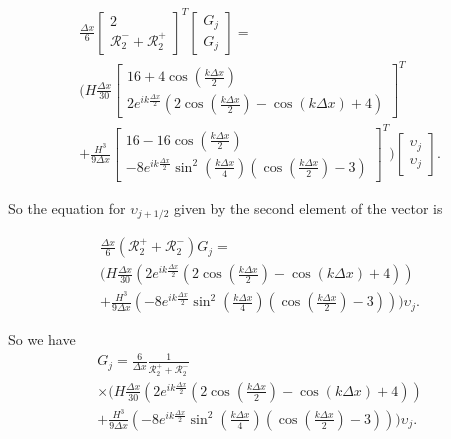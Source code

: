 \begin{multline*}
\frac{\Delta x}{6}\begin{bmatrix} 2  \\ \mathcal{R}^-_2 + \mathcal{R}^+_2 \end{bmatrix}^T \begin{bmatrix} G_j  \\ G_j\end{bmatrix}  = \\ \Bigg(H\frac{\Delta x}{30}\begin{bmatrix} 16  + 4 \cos\left(\frac{k \Delta x}{2}\right) \\ 2e^{ik\frac{\Delta x}{2}}\left(2\cos\left(\frac{k \Delta x}{2}\right) - \cos\left({k \Delta x}\right) + 4\right)  \end{bmatrix}^T  \\+ \frac{H^3 }{9\Delta x}\begin{bmatrix}  16  -16\cos\left(\frac{k \Delta x}{2}\right) \\  -8e^{ik\frac{\Delta x}{2}} \sin^2\left(\frac{k \Delta x}{4}\right)\left(\cos\left(\frac{k \Delta x}{2}\right) - 3 \right)    \end{bmatrix}^T    \Bigg) \begin{bmatrix} \upsilon_j  \\ \upsilon_{j} \end{bmatrix}.
\end{multline*}
 
 
 So the equation for $\upsilon_{j+1/2}$ given by the second element of the vector is
 
 \begin{multline*}
 \frac{\Delta x}{6}\left(\mathcal{R}^+_2 +\mathcal{R}^-_2\right)  G_j = \\ \Bigg(H\frac{\Delta x}{30} \left(2e^{ik\frac{\Delta x}{2}} \left(2\cos\left(\frac{k \Delta x}{2}\right) - \cos\left({k \Delta x}\right) + 4\right)\right) \\+ \frac{H^3 }{9\Delta x}\left(-8e^{ik\frac{\Delta x}{2}} \sin^2\left(\frac{k \Delta x}{4}\right)\left(\cos\left(\frac{k \Delta x}{2}\right) - 3 \right) \right)   \Bigg)  \upsilon_{j}.
 \end{multline*}
 
 So we have
  \begin{multline*}
 G_j = \frac{6}{\Delta x} \frac{1}{\mathcal{R}^+_2 +\mathcal{R}^-_2} \\ \times \Bigg(H\frac{\Delta x}{30} \left(2e^{ik\frac{\Delta x}{2}} \left(2\cos\left(\frac{k \Delta x}{2}\right) - \cos\left({k \Delta x}\right) + 4\right)\right) \\+ \frac{H^3 }{9\Delta x}\left(-8e^{ik\frac{\Delta x}{2}} \sin^2\left(\frac{k \Delta x}{4}\right)\left(\cos\left(\frac{k \Delta x}{2}\right) - 3 \right) \right)   \Bigg)  \upsilon_{j}.
  \end{multline*}

